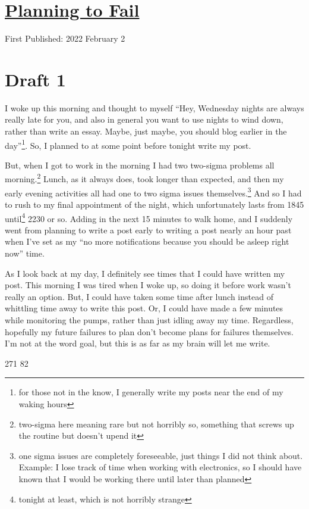 \documentclass[12pt]{article}[titlepage]
\newcommand{\say}[1]{``#1''}
\renewcommand{\,}{\textsuperscript{,}}
\begin{document}
\doublespacing
\section{\href{planning-to-fail.html}{Planning to Fail}}
First Published: 2022 February 2

\section{Draft 1}
I woke up this morning and thought to myself \say{Hey, Wednesday nights are always really late for you, and also in general you want to use nights to wind down, rather than write an essay.
Maybe, just maybe, you should blog earlier in the day}\footnote{for those not in the know, I generally write my posts near the end of my waking hours}.
So, I planned to at some point before tonight write my post.

But, when I got to work in the morning I had two two-sigma problems all morning.\footnote{two-sigma here meaning rare but not horribly so, something that screws up the routine but doesn't upend it}
Lunch, as it always does, took longer than expected, and then my early evening activities all had one to two sigma issues themselves.\footnote{one sigma issues are completely foreseeable, just things I did not think about. Example: I lose track of time when working with electronics, so I should have known that I would be working there until later than planned}
And so I had to rush to my final appointment of the night, which unfortunately lasts from 1845 until\footnote{tonight at least, which is not horribly strange} 2230 or so.
Adding in the next 15 minutes to walk home, and I suddenly went from planning to write a post early to writing a post nearly an hour past when I've set as my \say{no more notifications because you should be asleep right now} time.

As I look back at my day, I definitely see times that I could have written my post.
This morning I was tired when I woke up, so doing it before work wasn't really an option.
But, I could have taken some time after lunch instead of whittling time away to write this post.
Or, I could have made a few minutes while monitoring the pumps, rather than just idling away my time.
Regardless, hopefully my future failures to plan don't become plans for failures themselves.
I'm not at the word goal, but this is as far as my brain will let me write.

271
82
\end{document}
